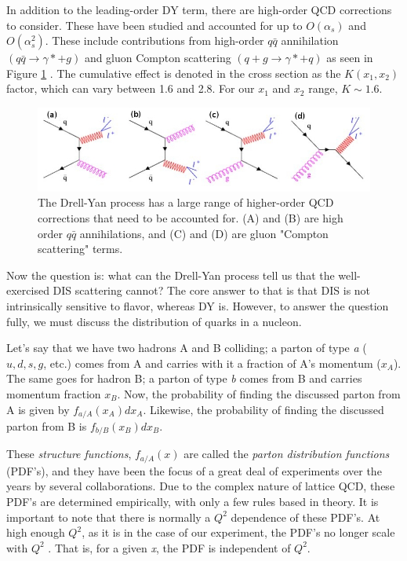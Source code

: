 In addition to the leading-order DY term, there are high-order QCD corrections to consider. These have been studied and accounted for up to $O(\alpha_s)$ and $O(\alpha_s^2)$. These include contributions from high-order $q\bar{q}$ annihilation $(q \bar{q} \rightarrow \gamma * + g)$ and gluon Compton scattering $(q + g \rightarrow \gamma * + q)$ as seen in Figure \ref{fig:nlo-dy} \cite{duan-2007-50}. The cumulative effect is denoted in the cross section as the $K(x_1,x_2)$ factor, which can vary between 1.6 and 2.8.  For our $x_1$ and $x_2$ range, $K \sim 1.6$.

\begin{figure}[h]
	\centering
	\includegraphics[width=5.00in]{figures/DY}
	\caption{The Drell-Yan process has a large range of higher-order QCD corrections that need to be accounted for. 
		(A) and (B) are high order $q\bar{q}$ annihilations, and (C) and (D) are gluon "Compton scattering" terms.}
	\label{fig:nlo-dy}
\end{figure}

Now the question is: what can the Drell-Yan process tell us that the well-exercised DIS scattering cannot? The core answer to that is that DIS is not intrinsically sensitive to flavor, whereas DY is. However, to answer the question fully, we must discuss the distribution of quarks in a nucleon.  

Let's say that we have two hadrons A and B colliding; a parton of type \emph{a} ($u, d, s, g$, etc.) comes from A and carries with it a fraction of A's momentum ($x_A$).  The same goes for hadron B; a parton of type \emph{b} comes from B and carries momentum fraction $x_B$. Now, the probability of finding the discussed parton from A is given by $f_{a/A}(x_A)dx_A$. Likewise, the probability of finding the discussed parton from B is $f_{b/B}(x_B)dx_B$.  

These \emph{structure functions}, $f_{a/A}(x)$ are called the \emph{parton distribution functions} (PDF's), and they have been the focus of a great deal of experiments over the years by several collaborations. Due to the complex nature of lattice QCD, these PDF's are determined empirically, with only a few rules based in theory. It is important to note that there is normally a $Q^2$ dependence of these PDF's. At high enough $Q^2$, as it is in the case of our experiment, the PDF's no longer scale with $Q^2$ \cite{Seely:2009gt}.  That is, for a given \emph{x}, the PDF is independent of $Q^2$.

